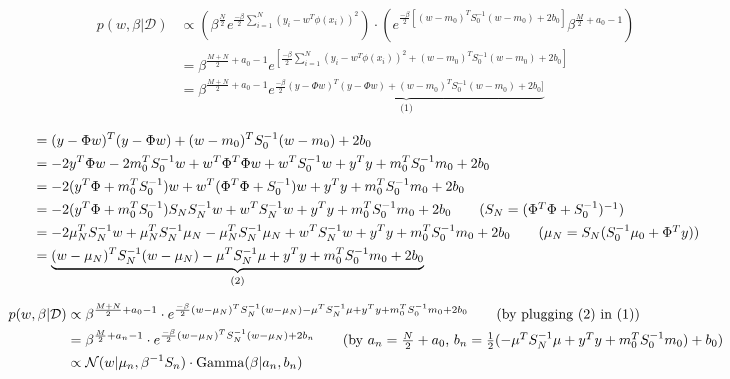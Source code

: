 \documentclass[11pt]{article}
\newcommand{\exercise}{\section{}}
\newcommand{\sumf}[3]{\sum_{#1}^{#2} #3}
\begin{document}
\exercise

\begin{align*}
p(w, \beta | \mathcal{D}) &\propto ( \beta^{\frac{N}{2}} e^{ \frac{-\beta}{2} \sumf{i=1}{N}{(y_i - w^T \phi(x_i))^2}}) \cdot ( e^{\frac{-\beta}{2} [ ( w - m_0 )^T S_0^{-1} ( w - m_0 ) + 2b_0]} \beta^{\frac{M}{2} + a_0 - 1} ) \\
&= \beta^{\frac{M + N}{2} + a_0 - 1} e^{ [ \frac{-\beta}{2} \sumf{i=1}{N}{(y_i - w^T \phi(x_i))^2} + ( w - m_0 )^T S_0^{-1} ( w - m_0 ) + 2b_0]} \\
&= \beta^{\frac{M + N}{2} + a_0 - 1} \underbrace{e^{ \frac{-\beta}{2} (y - \Phi w )^T (y - \Phi w) + ( w - m_0 )^T S_0^{-1} ( w - m_0 ) + 2b_0]}}_\text{(1)}
\end{align*}

\begin{align*}
&= (y - \Phi w )^T (y - \Phi w) + ( w - m_0 )^T S_0^{-1} ( w - m_0 ) + 2b_0 \\
&= -2 y^T \Phi w -2m_0^T S_0^{-1}w + w^T \Phi^T \Phi w + w^T S_0^{-1} w + y^T y + m_0^T S_0^{-1} m_0 + 2b_0 \\
&= -2(y^T \Phi + m_0^T S_0^{-1})w + w^T (\Phi^T \Phi + S_0^{-1}) w + y^T y + m_0^T S_0^{-1} m_0 + 2b_0 \\
&= -2 (y^T \Phi + m_0^T S_0^{-1})S_N S_N^{-1}w +  w^T S_N^{-1}w + y^T y + m_0^T S_0^{-1} m_0 + 2b_0 \tag{$S_N = (\Phi^T \Phi + S_0^{-1})^{-1}$} \\
&=  -2 \mu_N^T S_N^{-1} w + \mu_N^T S_N^{-1} \mu_N - \mu_N^T S_N^{-1} \mu_N + w^T S_N^{-1}w + y^T y + m_0^T S_0^{-1} m_0 + 2b_0 \tag{$\mu_N = S_N(S_0^{-1} \mu_0 + \Phi^T y)$} \\
&= \underbrace{(w - \mu_N)^T S_N^{-1} (w - \mu_N) - \mu^TS_N^{-1}\mu + y^T y + m_0^T S_0^{-1} m_0 + 2b_0}_\text{(2)}
\end{align*}

\begin{align*}
p(w, \beta | \mathcal{D}) &\propto \beta^{\frac{M + N}{2} + a_0 - 1} \cdot e^{ \frac{-\beta}{2} (w - \mu_N)^T S_N^{-1} (w - \mu_N) - \mu^T S_N^{-1}\mu + y^T y + m_0^T S_0^{-1} m_0 + 2b_0} \tag{by plugging (2) in (1)} \\
&= \beta^{ \frac{M}{2} + a_n - 1} \cdot e^{ \frac{-\beta}{2} (w - \mu_N)^T S_N^{-1} (w - \mu_N) + 2 b_n} \tag{by $a_n = \frac{N}{2} + a_0$, $b_n = \frac{1}{2}( - \mu^T S_N^{-1}\mu + y^T y + m_0^T S_0^{-1} m_0) + b_0$} \\
&\propto \mathcal{N}(w | \mu_n, \beta^{-1} S_n) \cdot \text{Gamma}(\beta | a_n, b_n)
\end{align*}
\end{document}
